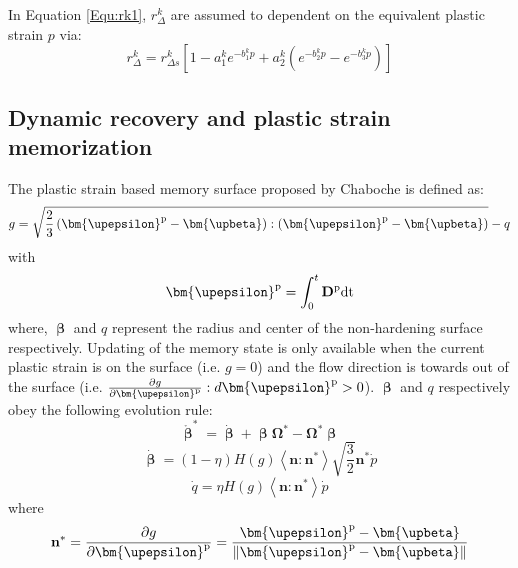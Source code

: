 In Equation \ref{Equ:rk1}, $r_\Delta ^k$ are assumed to dependent on the equivalent plastic strain $p$ via:
\begin{equation}
\label{Equ:rdeltak1}
r_\Delta ^k = r_{\Delta s}^k\left[ {1 - a_1^k{e^{ - b_1^kp}} + a_2^k({e^{ - b_2^kp}} - {e^{ - b_3^kp}})} \right]
\end{equation}

\subsection{Dynamic recovery and plastic strain memorization}
The plastic strain based memory surface proposed by Chaboche is defined as:
\begin{equation}
\label{Equ:g1}
g = \sqrt {\frac{2}{3}\left( {{{\bm{\upepsilon }}^{\rm{p}}} - {\bm{\upbeta}}} \right):\left( {{{\bm{\upepsilon }}^{\rm{p}}} - {\bm{\upbeta}}} \right)}  - q
\end{equation}
with
\begin{equation}
{{\bm{\upepsilon }}^{\rm{p}}}=\int_0^t{{\mathbf{D}}^{\rm{p}} \rm{dt}}
\end{equation}
where, $\bm{\upbeta}$ and $q$ represent the radius and center of the non-hardening surface respectively.
Updating of the memory state is only available when the current plastic strain is on the surface (i.e. $g=0$) and the flow direction is towards out of the surface (i.e. $\frac{{\partial g}}{{\partial {{\bm{\upepsilon }}^{\rm{p}}}}}:d{{\bm{\upepsilon }}^{\rm{p}}} > 0$). $\bm{\upbeta}$ and $q$ respectively obey the following evolution rule:
\begin{equation}
{\mathring {\bm{\upbeta }}^{*}} = \dot {\bm{\upbeta }}  + \bm{\upbeta } {{\mathbf{\Omega }}^*} - {{\mathbf{\Omega }}^*}\bm{\upbeta }
\end{equation}
\begin{equation}
\label{Equ:dotbeta1}
\dot{\bm{\upbeta}}  = \left( {1 - \eta } \right)H\left( g \right)\left\langle {{\mathbf{n}}:{{\mathbf{n}}^*}} \right\rangle \sqrt {\frac{3}{2}} {{\mathbf{n}}^*}\dot p
\end{equation}
\begin{equation}
\label{Equ:dotq1}
\dot q = \eta H\left( g \right)\left\langle {{\mathbf{n}}:{{\mathbf{n}}^*}} \right\rangle \dot p
\end{equation}
where
\begin{equation}
\label{Equ:nstar}
{{\mathbf{n}}^*} = \frac{{\partial g}}{{\partial {{\bm{\upepsilon }}^{\rm{p}}}}} = \frac{{{{\bm{\upepsilon }}^{\rm{p}}} - {\bm{\upbeta}}}}{{\left\| {{{\bm{\upepsilon }}^{\rm{p}}} - {\bm{\upbeta}}} \right\|}}
\end{equation}


